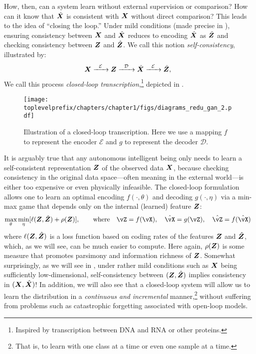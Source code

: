 \documentclass[../../book-main.tex]{subfiles}
\begin{document}
How, then, can a system learn without external supervision or comparison? How can it know that $\hat {\bm{X}}$ is consistent with $\bm{X}$ without direct comparison? This leads to the idea of ``closing the loop.'' Under mild conditions (made precise in ), ensuring consistency between $\bm{X}$ and $\hat {\bm{X}}$ reduces to encoding $\hat {\bm{X}}$ as $\hat {\bm{Z}}$ and checking consistency between $\bm{Z}$ and $\hat {\bm{Z}}$. We call this notion \textit{self-consistency}, illustrated by:
\begin{equation}
    \bm{X}   \xrightarrow{\hspace{2mm} \mathcal{E}\hspace{2mm}} \bm{Z}  \xrightarrow{\hspace{2mm} \mathcal{D} \hspace{2mm}} \hat {\bm{X}} \xrightarrow{\hspace{2mm} \mathcal{E}\hspace{2mm}} \hat {\bm{Z}},
    \label{eqn:closed-loop}
\end{equation}
We call this process \textit{closed-loop transcription},\footnote{Inspired by transcription between DNA and RNA or other proteins.} depicted in .

\begin{figure}[t]
    \centering
\texttt{[image: \\toplevelprefix/chapters/chapter1/figs/diagrams\_redu\_gan\_2.pdf]}
\caption{Illustration of a closed-loop transcription. Here we use a mapping $f$ to represent the encoder $\mathcal{E}$ and $g$ to represent the decoder $\mathcal{D}$.}  \label{fig:closed-loop}
\end{figure}

It is arguably true that any autonomous intelligent being only needs to learn a self-consistent representation $\bm{Z}$ of the observed data $\bm{X}$, because checking consistency in the original data space---often meaning in the external world---is either too expensive or even physically infeasible. The closed-loop formulation allows one to learn an optimal encoding $f(\cdot, \theta)$ and decoding $g(\cdot, \eta)$ via a min-max game that depends only on the internal (learned) feature $\bm{Z}$:
\begin{equation}
\max_{\theta}\min_{\eta} [\ell( \Z, \hat \Z) + \rho(\Z)],  \qquad \text{where} \quad \vZ = f(\vX), \quad \hat \vX = g(\vZ), \quad \hat \vZ = f(\hat \vX) 
   \label{eqn:closed-loop-objective}
\end{equation}
where $\ell( \bm{Z}, \hat {\bm{Z}})$ is a loss function based on coding rates of the features $\bm{Z}$ and $\hat {\bm{Z}}$, which, as we will see, can be much easier to compute. Here again, $\rho(\bm{Z})$ is some measure that promotes parsimony and information richness of $\bm{Z}$. Somewhat surprisingly, as we will see in , under rather mild conditions such as $\bm{X}$ being sufficiently low-dimensional, self-consistency between $(\bm{Z}, \hat {\bm{Z}})$ implies consistency in $(\bm{X}, \hat {\bm{X}})$! In addition, we will also see that a closed-loop system will allow us to learn the distribution in a \textit{continuous and incremental} manner,\footnote{That is, to learn with one class at a time or even one sample at a time.} without suffering from problems such as catastrophic forgetting associated with open-loop models.
\end{document}
